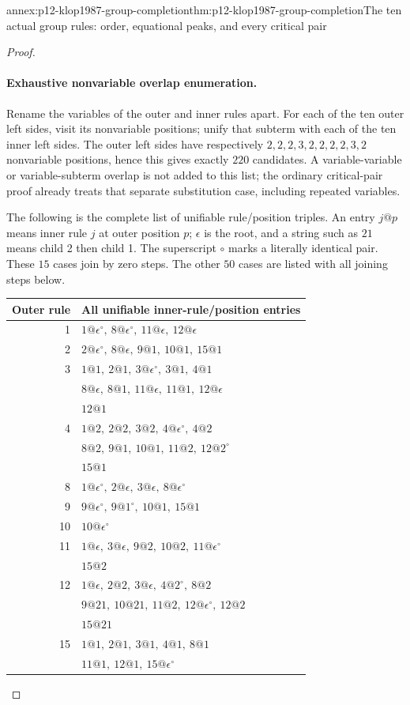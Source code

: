 \begin{annexitem}{annex:p12-klop1987-group-completion}{thm:p12-klop1987-group-completion}{The ten actual group rules: order, equational peaks, and every critical pair}
\begin{proof}
\paragraph{Exhaustive nonvariable overlap enumeration.}
Rename the variables of the outer and inner rules apart.
For each of the ten outer left sides, visit its nonvariable positions;
unify that subterm with each of the ten inner left sides.
The outer left sides have respectively \(2,2,2,3,2,2,2,2,3,2\)
nonvariable positions, hence this gives exactly \(220\) candidates.
A variable-variable or variable-subterm overlap is not added to
this list; the ordinary critical-pair proof already treats that
separate substitution case, including repeated variables.

The following is the complete list of unifiable rule/position triples.
An entry \(j@p\) means inner rule \(j\) at outer position \(p\);
\(\epsilon\) is the root, and a string such as \(21\) means child 2
then child 1. The superscript \(\circ\) marks a literally identical
pair. These \(15\) cases join by zero steps. The other \(50\)
cases are listed with all joining steps below.
\begin{center}
\begin{tabular}{rl}
Outer rule & All unifiable inner-rule/position entries\\
\hline
1 & \(1@\epsilon^{\circ},\ 8@\epsilon^{\circ},\ 11@\epsilon,\ 12@\epsilon\)\\
2 & \(2@\epsilon^{\circ},\ 8@\epsilon,\ 9@1,\ 10@1,\ 15@1\)\\
3 & \(1@1,\ 2@1,\ 3@\epsilon^{\circ},\ 3@1,\ 4@1\)\\
 & \(8@\epsilon,\ 8@1,\ 11@\epsilon,\ 11@1,\ 12@\epsilon\)\\
 & \(12@1\)\\
4 & \(1@2,\ 2@2,\ 3@2,\ 4@\epsilon^{\circ},\ 4@2\)\\
 & \(8@2,\ 9@1,\ 10@1,\ 11@2,\ 12@2^{\circ}\)\\
 & \(15@1\)\\
8 & \(1@\epsilon^{\circ},\ 2@\epsilon,\ 3@\epsilon,\ 8@\epsilon^{\circ}\)\\
9 & \(9@\epsilon^{\circ},\ 9@1^{\circ},\ 10@1,\ 15@1\)\\
10 & \(10@\epsilon^{\circ}\)\\
11 & \(1@\epsilon,\ 3@\epsilon,\ 9@2,\ 10@2,\ 11@\epsilon^{\circ}\)\\
 & \(15@2\)\\
12 & \(1@\epsilon,\ 2@2,\ 3@\epsilon,\ 4@2^{\circ},\ 8@2\)\\
 & \(9@21,\ 10@21,\ 11@2,\ 12@\epsilon^{\circ},\ 12@2\)\\
 & \(15@21\)\\
15 & \(1@1,\ 2@1,\ 3@1,\ 4@1,\ 8@1\)\\
 & \(11@1,\ 12@1,\ 15@\epsilon^{\circ}\)\\
\end{tabular}
\end{center}


\end{proof}
\end{annexitem}
